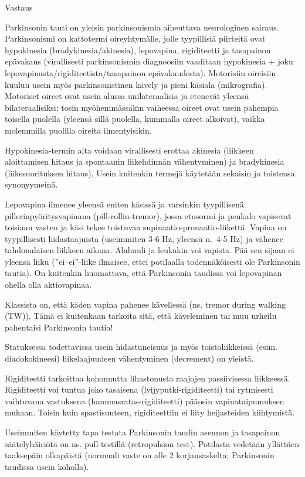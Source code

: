\documentclass[
]{book}
\begin{document}
Vastaus

Parkinsonin tauti on yleisin parkinsonismia aiheuttava neurologinen sairaus. Parkinsonismi on kattotermi oireyhtymälle, jolle tyypillisiä piirteitä ovat hypokinesia (bradykinesia/akinesia), lepovapina, rigiditeetti ja tasapainon epävakaus (virallisesti parkinsonismin diagnoosiin vaaditaan hypokinesia + joku lepovapinasta/rigiditeetista/tasapainon epävakaudesta). Motorisiin oireisiin kuuluu usein myös parkinsonistinen kävely ja pieni käsiala (mikrografia). Motoriset oireet ovat usein alussa unilateraalisia ja etenevät yleensä bilateraalisiksi; tosin myöhemmässäkin vaiheessa oireet ovat usein pahempia toisella puolella (yleensä sillä puolella, kummalla oireet alkoivat), vaikka molemmilla puolilla oireita ilmentyisikin.

Hypokinesia-termin alta voidaan virallisesti erottaa akinesia (liikkeen aloittamisen hitaus ja spontaanin liikehdinnän vähentyminen) ja bradykinesia (liikesuorituksen hitaus). Usein kuitenkin termejä käytetään sekaisin ja toistensa synonyymeinä.

Lepovapina ilmenee yleensä eniten käsissä ja varsinkin tyypillisenä pillerinpyöritysvapinana (pill-rollin-tremor), jossa etusormi ja peukalo vapisevat toisiaan vasten ja käsi tekee toistuvaa supinaatio-pronaatio-liikettä. Vapina on tyypillisesti hidastaajuista (useimmiten 3-6 Hz, yleensä n.~4-5 Hz) ja vähenee tahdonalaisen liikkeen aikana. Alahuuli ja leukakin voi vapista. Pää sen sijaan ei yleensä liiku (''ei--ei''-liike ilmaisee, ettei potilaalla todennäköisesti ole Parkinsonin tautia). On kuitenkin huomattava, että Parkinsonin taudissa voi lepovapinan ohella olla aktiovapinaa.

Klassista on, että käden vapina pahenee kävellessä (ns. tremor during walking (TW)). Tämä ei kuitenkaan tarkoita sitä, että käveleminen tai muu urheilu pahentaisi Parkinsonin tautia!

Statuksessa todettavissa usein hidastuneisuus ja myös toistoliikkeissä (esim. diadokokineesi) liikelaajuudeen vähentyminen (decrement) on yleistä.

Rigiditeetti tarkoittaa kohonnutta lihastonusta raajojen passiivisessa liikkeessä. Rigiditeetti voi tuntua joko tasaisena (lyijyputki-rigiditeetti) tai rytmisesti vaihtuvana vastuksena (hammasratas-rigiditeetti) pääosin vapinataipumuksen mukaan. Toisin kuin spastisuuteen, rigiditeettiin ei liity heijasteiden kiihtymistä.

Useimmiten käytetty tapa testata Parkinsonin taudin asennon ja tasapainon säätelyhäiriötä on ns. pull-testillä (retropulsion test). Potilasta vedetään yllättäen taaksepäin olkapäistä (normaali vaste on alle 2 korjausaskelta; Parkinsonin taudissa usein koholla).
\end{document}
